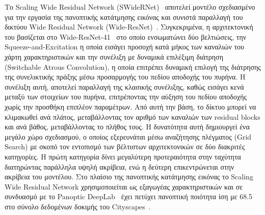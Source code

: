 \documentclass[12pt]{article}
\numberwithin{equation}{section}
\begin{document}
Το Scaling Wide Residual Network (SWideRNet)~\cite{chen2021scalingwideresidualnetworks} αποτελεί μοντέλο σχεδιασμένο για την εργασία της πανοπτικής κατάτμησης εικόνας και συνιστά παραλλαγή του δικτύου Wide Residual Network (Wide-ResNet)~\cite{zagoruyko2017wideresidualnetworks}. Συγκεκριμένα, η αρχιτεκτονική του βασίζεται στο Wide-ResNet-41~\cite{zagoruyko2017wideresidualnetworks} στο οποίο ενσωματώνει δύο βελτιώσεις, την Squeeze-and-Excitation η οποία εισάγει προσοχή κατά μήκος των καναλιών του χάρτη χαρακτηριστικών και την συνέλιξη με δυναμικά επιλέξιμη διάτρηση (Switchable Atrous Convolution), η οποία επιτρέπει δυναμική επιλογή της διάτρησης της συνελικτικής πράξης μέσω προσαρμογής του πεδίου αποδοχής του πυρήνα. Η συνέλιξη αυτή, αποτελεί παραλλαγή της κλασικής συνέλιξης, καθώς εισάγει κενά μεταξύ των στοιχείων του πυρήνα, επιτρέποντας την αύξηση του πεδίου αποδοχής χωρίς την προσθήκη επιπλέον παραμέτρων. Από αυτή την βάση, το δίκτυο μπορεί να κλιμακωθεί ανά πλάτος, μεταβάλλοντας τον αριθμό των καναλιών των residual blocks και ανά βάθος, μεταβάλλοντας το πλήθος τους. Η δυνατότητα αυτή δημιουργεί ένα μεγάλο χώρο σχεδιασμού, ο οποίος εξερευνάται μέσω αναζήτησης πλέγματος (Grid Search) με σκοπό τον εντοπισμό των βέλτιστων αρχιτεκτονικών σε δύο διακριτές κατηγορίες. Η πρώτη κατηγορία δίνει μεγαλύτερη προτεραιότητα στην ταχύτητα διατηρώντας παράλληλα υψηλή ακρίβεια, ενώ η δεύτερη επικεντρώνεται στην ακρίβεια του μοντέλου. Στο πλαίσιο της πανοπτικής κατάτμησης εικόνας το Scaling Wide Residual Network χρησιμοποιείται ως εξαγωγέας χαρακτηριστικών και σε συνδυασμό με το Panoptic DeepLab~\cite{cheng2020panopticdeeplabsimplestrongfast} έχει πετύχει πανοπτική ποιότητα ίση με 68.5 στο σύνολο δεδομένων δοκιμής του Cityscapes~\cite{DBLP:journals/corr/CordtsORREBFRS16}. \\
\end{document}
